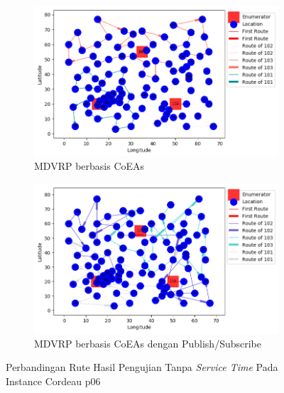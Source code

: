 \begin{figure}[H]
	\centering
	\begin{subfigure}[t]{\textwidth}
		\centering
		\includegraphics[width=\textwidth]{Resources/Images/cordeau_p06/cordeau_p06_notw_coes}
		\caption{MDVRP berbasis CoEAs}
		\label{fig:cordeau_p06_notw_coes}
	\end{subfigure}
	\begin{subfigure}[t]{\textwidth}
		\centering
		\includegraphics[width=\textwidth]{Resources/Images/cordeau_p06/cordeau_p06_notw_pubsub_coes}
		\caption{MDVRP berbasis CoEAs dengan Publish/Subscribe}
		\label{fig:cordeau_p06_notw_pubsub_coes}
	\end{subfigure}
	\caption{Perbandingan Rute Hasil Pengujian Tanpa \textit{Service Time} Pada Instance Cordeau p06}
	\label{fig:cordeau_p06_notw}
\end{figure}


